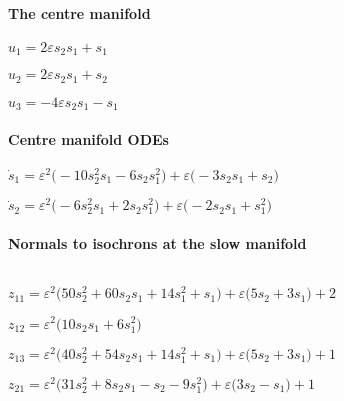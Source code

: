 \documentclass[11pt,a5paper]{article}
\def\eps{\varepsilon}
\begin{document}
\paragraph{The centre manifold} 

\begin{math}
u_{1}=2 \varepsilon  s_{2} s_{1}+s_{1}
\end{math}\par

\begin{math}
u_{2}=2 \varepsilon  s_{2} s_{1}+s_{2}
\end{math}\par

\begin{math}
u_{3}=-4 \varepsilon  s_{2} s_{1}-s_{1}
\end{math}\par
 
\paragraph{Centre manifold ODEs}

\begin{math}
\dot s_{1}=\varepsilon ^{2} \big(-10 s_{2}^{2} s_{1}-6 s_{2} s_{1}^{2}
\big)+\varepsilon  \big(-3 s_{2} s_{1}+s_{2}\big)
\end{math}\par

\begin{math}
\dot s_{2}=\varepsilon ^{2} \big(-6 s_{2}^{2} s_{1}+2 s_{2} s_{1}^{2}
\big)+\varepsilon  \big(-2 s_{2} s_{1}+s_{1}^{2}\big)
\end{math}

\paragraph{Normals to isochrons at the slow manifold}
\(
\)\par

\(z_{11}=\eps^{2} \big(50 s_{2}^{2}+60 s_{2} s_{1}+14 s_{1}^{2}+s_{1}\big)
+\eps \big(5 s_{2}+3 s_{1}\big)+2
\)\par

\(z_{12}=\eps^{2} \big(10 s_{2} s_{1}+6 s_{1}^{2}\big)
\)\par

\(z_{13}=\eps^{2} \big(40 s_{2}^{2}+54 s_{2} s_{1}+14 s_{1}^{2}+s_{1}\big)
+\eps \big(5 s_{2}+3 s_{1}\big)+1
\)\par

\(z_{21}=\eps^{2} \big(31 s_{2}^{2}+8 s_{2} s_{1}-s_{2}-9 s_{1}^{2}\big)+
\eps \big(3 s_{2}-s_{1}\big)+1
\)\par
\end{document}
